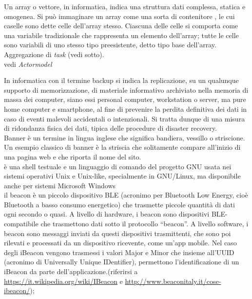 \documentclass{scalatekids-article}
\begin{document}
 Un array o vettore, in informatica, indica una struttura dati complessa, statica e omogenea. Si può immaginare un array come una sorta di contenitore , le cui caselle sono dette celle dell'array stesso. Ciascuna delle celle si comporta come una variabile tradizionale che rappresenta un elemento dell'array; tutte le celle sono variabili di uno stesso tipo preesistente, detto tipo base dell'array.
\\

 Aggregazione di \textit{task} (vedi sotto).
\\

 vedi \textit{Actormodel}
\\


 In informatica con il termine backup si indica la replicazione, su un qualunque supporto di memorizzazione, di materiale informativo archiviato nella memoria di massa dei computer, siano essi personal computer, workstation o server, ma pure home computer e smartphone, al fine di prevenire la perdita definitiva dei dati in caso di eventi malevoli accidentali o intenzionali. Si tratta dunque di una misura di ridondanza fisica dei dati, tipica delle procedure di disaster recovery.
\\

 Banner è un termine in lingua inglese che significa bandiera, vessillo o striscione. Un esempio classico di banner è la striscia che solitamente compare all'inizio di una pagina web e che riporta il nome del sito.
\\

 è una shell testuale e un linguaggio di comando del progetto GNU usata nei sistemi operativi Unix e Unix-like, specialmente in GNU/Linux, ma disponibile anche per sistemi Microsoft Windows
\\

 il beacon è un piccolo dispositivo BLE (acronimo per Bluetooth Low Energy, cioè Bluetooth a basso consumo energetico) che trasmette piccole quantità di dati ogni secondo o quasi.  A livello di hardware, i beacon sono dispositivi BLE-compatibile che trasmettono dati sotto il protocollo “beacon”.
A livello software, i beacon sono messaggi inviati da questi dispositivi trasmittenti, che sono poi rilevati e processati da un dispositivo ricevente, come un’app mobile. Nel caso degli iBeacon vengono trasmessi i valori Major e Minor che insieme all’UUID (acronimo di Universally Unique IDentifier), permettono l’identificazione di un iBeacon da parte dell’applicazione.(riferirsi a \url{https://it.wikipedia.org/wiki/IBeacon} e \url{http://www.beaconitaly.it/cose-ibeacon/});
\\
\end{document}
